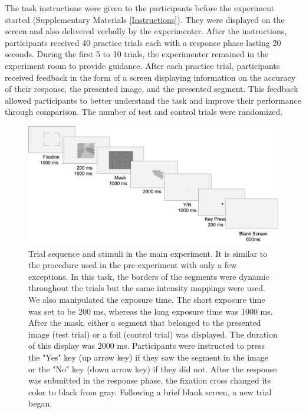 \documentclass{article}
\begin{document}
The task instructions were given to the participants before the experiment started (Supplementary Materials \ref{Instructions}). They were displayed on the screen and also delivered verbally by the experimenter. After the instructions, participants received 40 practice trials each with a response phase lasting 20 seconds. During the first 5 to 10 trials, the experimenter remained in the experiment room to provide guidance. After each practice trial, participants received feedback in the form of a screen displaying information on the accuracy of their response, the presented image, and the presented segment. This feedback allowed participants to better understand the task and improve their performance through comparison. The number of test and control trials were randomized.

\begin{figure}
    \centering
    \includegraphics[width=\textwidth]{images/experimentalProcedure.png}
    \caption{Trial sequence and stimuli in the main experiment. It is similar to the procedure used in the pre-experiment with only a few exceptions. In this task, the borders of the segments were dynamic throughout the trials but the same intensity mappings were used. We also manipulated the exposure time. The short exposure time was set to be 200 ms, whereas the long exposure time was 1000 ms. After the mask, either a segment that belonged to the presented image (test trial) or a foil (control trial) was displayed. The duration of this display was 2000 ms. Participants were instructed to press the "Yes" key (up arrow key) if they saw the segment in the image or the "No" key (down arrow key) if they did not. After the response was submitted in the response phase, the fixation cross changed its color to black from gray. Following a brief blank screen, a new trial began.}
    \label{fig:exp_procedure}
\end{figure}
\end{document}
